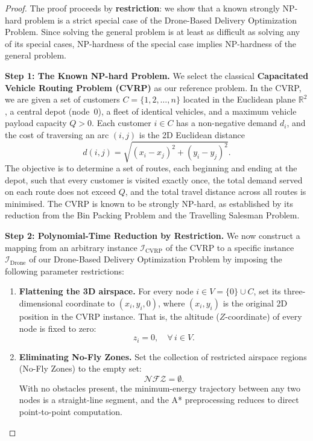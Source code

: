 \documentclass[11pt,a4paper]{article}
\begin{document}
\begin{proof}
The proof proceeds by \textbf{restriction}: we show that a known strongly NP-hard problem is a strict special case of the Drone-Based Delivery Optimization Problem. Since solving the general problem is at least as difficult as solving any of its special cases, NP-hardness of the special case implies NP-hardness of the general problem.

\medskip

\noindent\textbf{Step 1: The Known NP-hard Problem.}\quad
We select the classical \textbf{Capacitated Vehicle Routing Problem (CVRP)} as our reference problem. In the CVRP, we are given a set of customers $C = \{1, 2, \ldots, n\}$ located in the Euclidean plane $\mathbb{R}^2$, a central depot (node~$0$), a fleet of identical vehicles, and a maximum vehicle payload capacity $Q > 0$. Each customer $i \in C$ has a non-negative demand $d_i$, and the cost of traversing an arc $(i,j)$ is the 2D Euclidean distance
\[
  d(i,j) = \sqrt{(x_i - x_j)^2 + (y_i - y_j)^2}.
\]
The objective is to determine a set of routes, each beginning and ending at the depot, such that every customer is visited exactly once, the total demand served on each route does not exceed $Q$, and the total travel distance across all routes is minimised. The CVRP is known to be strongly NP-hard, as established by its reduction from the Bin Packing Problem and the Travelling Salesman Problem.

\medskip

\noindent\textbf{Step 2: Polynomial-Time Reduction by Restriction.}\quad
We now construct a mapping from an arbitrary instance $\mathcal{I}_{\text{CVRP}}$ of the CVRP to a specific instance $\mathcal{I}_{\text{Drone}}$ of our Drone-Based Delivery Optimization Problem by imposing the following parameter restrictions:

\begin{enumerate}
  \item \textbf{Flattening the 3D airspace.}\quad
    For every node $i \in V = \{0\} \cup C$, set its three-dimensional coordinate to $(x_i, y_i, 0)$, where $(x_i, y_i)$ is the original 2D position in the CVRP instance. That is, the altitude ($Z$-coordinate) of every node is fixed to zero:
    \[
      z_i = 0, \quad \forall\, i \in V.
    \]

  \item \textbf{Eliminating No-Fly Zones.}\quad
    Set the collection of restricted airspace regions (No-Fly Zones) to the empty set:
    \[
      \mathcal{NFZ} = \emptyset.
    \]
    With no obstacles present, the minimum-energy trajectory between any two nodes is a straight-line segment, and the A* preprocessing reduces to direct point-to-point computation.


\end{enumerate}
\end{proof}
\end{document}
